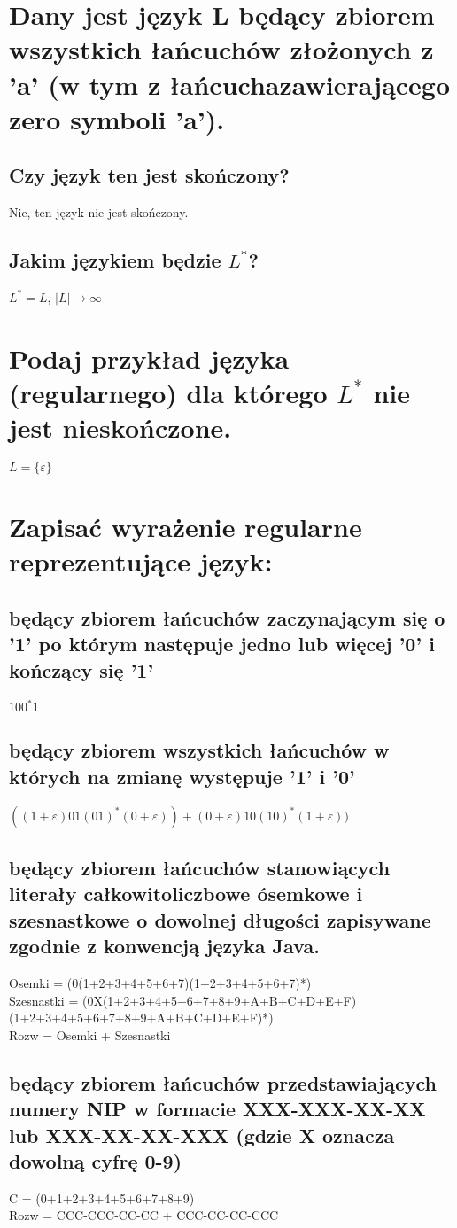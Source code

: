 \documentclass[a4paper,11pt]{article}
\begin{document}
\section{Dany jest język L będący zbiorem wszystkich łańcuchów złożonych z 'a' (w tym z łańcuchazawierającego zero symboli 'a').}
\subsection{Czy język ten jest skończony?}
Nie, ten język nie jest skończony.
\subsection{Jakim językiem będzie $L^*$?}
$L^* = L$, $|L| \rightarrow \infty$

\section{Podaj przykład języka (regularnego) dla którego $L^*$ nie jest nieskończone.}
$L = \{\varepsilon\}$

\newpage
\section{Zapisać wyrażenie regularne reprezentujące język:}
\subsection{będący zbiorem łańcuchów zaczynającym się o '1' po którym następuje jedno lub więcej '0' i kończący się '1'}
	$100^*1$
\subsection{będący zbiorem wszystkich łańcuchów w których na zmianę występuje '1' i '0'}
	$((1+\varepsilon)01(01)^*(0+\varepsilon)) + (0+\varepsilon)10(10)^*(1+\varepsilon))$
\subsection{będący zbiorem łańcuchów stanowiących literały całkowitoliczbowe ósemkowe i szesnastkowe o dowolnej długości zapisywane zgodnie z konwencją języka Java.}
	Osemki = (0(1+2+3+4+5+6+7)(1+2+3+4+5+6+7)*) \\
	Szesnastki = (0X(1+2+3+4+5+6+7+8+9+A+B+C+D+E+F)(1+2+3+4+5+6+7+8+9+A+B+C+D+E+F)*) \\
	Rozw = Osemki + Szesnastki
\subsection{będący zbiorem łańcuchów przedstawiających numery NIP w formacie XXX-XXX-XX-XX lub XXX-XX-XX-XXX (gdzie X oznacza dowolną cyfrę 0-9)}
C = (0+1+2+3+4+5+6+7+8+9)  \\
Rozw = CCC-CCC-CC-CC + CCC-CC-CC-CCC
\end{document}
